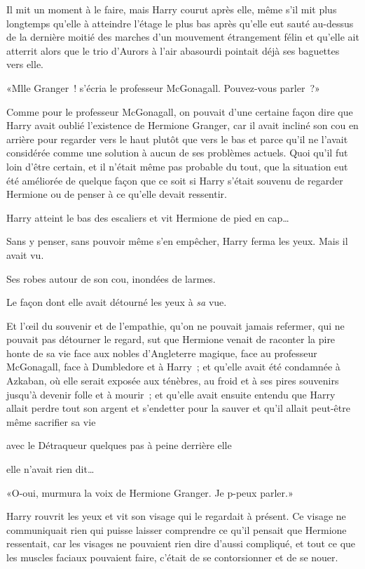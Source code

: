 Il mit un moment à le faire, mais Harry courut après elle, même s'il mit plus longtemps qu'elle à atteindre l'étage le plus bas après qu'elle eut sauté au-dessus de la dernière moitié des marches d'un mouvement étrangement félin et qu'elle ait atterrit alors que le trio d'Aurors à l'air abasourdi pointait déjà ses baguettes vers elle.

«Mlle Granger~! s'écria le professeur McGonagall. Pouvez-vous parler~?»

Comme pour le professeur McGonagall, on pouvait d'une certaine façon dire que Harry avait oublié l'existence de Hermione Granger, car il avait incliné son cou en arrière pour regarder vers le haut plutôt que vers le bas et parce qu'il ne l'avait considérée comme une solution à aucun de ses problèmes actuels. Quoi qu'il fut loin d'être certain, et il n'était même pas probable du tout, que la situation eut été améliorée de quelque façon que ce soit si Harry s'était souvenu de regarder Hermione ou de penser à ce qu'elle devait ressentir.

Harry atteint le bas des escaliers et vit Hermione de pied en cap…

Sans y penser, sans pouvoir même s'en empêcher, Harry ferma les yeux. Mais il avait vu.

Ses robes autour de son cou, inondées de larmes.

Le façon dont elle avait détourné les yeux à \emph{sa} vue.

Et l'œil du souvenir et de l'empathie, qu'on ne pouvait jamais refermer, qui ne pouvait pas détourner le regard, sut que Hermione venait de raconter la pire honte de sa vie face aux nobles d'Angleterre magique, face au professeur McGonagall, face à Dumbledore et à Harry~; et qu'elle avait été condamnée à Azkaban, où elle serait exposée aux ténèbres, au froid et à ses pires souvenirs jusqu'à devenir folle et à mourir~; et qu'elle avait ensuite entendu que Harry allait perdre tout son argent et s'endetter pour la sauver et qu'il allait peut-être même sacrifier sa vie

avec le Détraqueur quelques pas à peine derrière elle

elle n'avait rien dit…

«O-oui, murmura la voix de Hermione Granger. Je p-peux parler.»

Harry rouvrit les yeux et vit son visage qui le regardait à présent. Ce visage ne communiquait rien qui puisse laisser comprendre ce qu'il pensait que Hermione ressentait, car les visages ne pouvaient rien dire d'aussi compliqué, et tout ce que les muscles faciaux pouvaient faire, c'était de se contorsionner et de se nouer.

